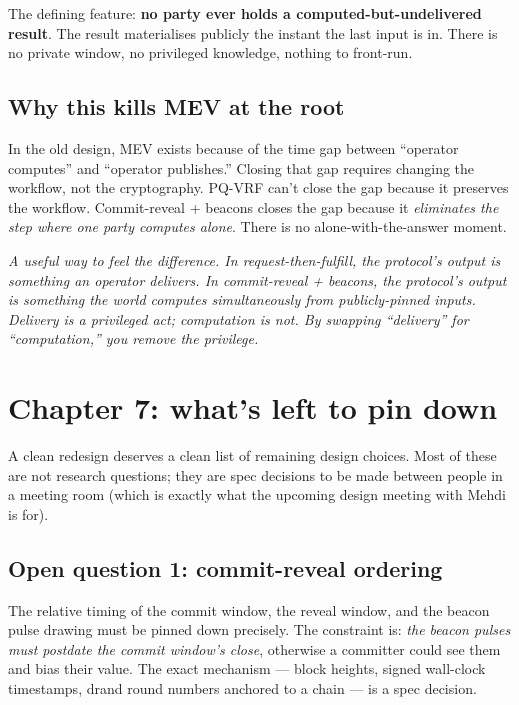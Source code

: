 \documentclass[11pt]{article}
\newenvironment{aside}{\par\medskip\noindent\itshape\small\color{black!70}}{\normalfont\par\medskip}
\begin{document}
The defining feature: \textbf{no party ever holds a computed-but-undelivered result}. The result materialises publicly the instant the last input is in. There is no private window, no privileged knowledge, nothing to front-run.

\subsection*{Why this kills MEV at the root}

In the old design, MEV exists because of the time gap between ``operator computes'' and ``operator publishes.'' Closing that gap requires changing the workflow, not the cryptography. PQ-VRF can't close the gap because it preserves the workflow. Commit-reveal + beacons closes the gap because it \emph{eliminates the step where one party computes alone}. There is no alone-with-the-answer moment.

\begin{aside}
A useful way to feel the difference. In request-then-fulfill, the protocol's output is something an operator \emph{delivers}. In commit-reveal + beacons, the protocol's output is something the world \emph{computes simultaneously} from publicly-pinned inputs. Delivery is a privileged act; computation is not. By swapping ``delivery'' for ``computation,'' you remove the privilege.
\end{aside}

\section{Chapter 7: what's left to pin down}

A clean redesign deserves a clean list of remaining design choices. Most of these are not research questions; they are spec decisions to be made between people in a meeting room (which is exactly what the upcoming design meeting with Mehdi is for).

\subsection*{Open question 1: commit-reveal ordering}

The relative timing of the commit window, the reveal window, and the beacon pulse drawing must be pinned down precisely. The constraint is: \emph{the beacon pulses must postdate the commit window's close}, otherwise a committer could see them and bias their value. The exact mechanism --- block heights, signed wall-clock timestamps, drand round numbers anchored to a chain --- is a spec decision.
\end{document}
